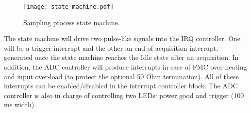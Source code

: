 \documentclass[a4paper]{article}
\begin{document}
\begin{figure}[htbp]
  \centering
  \texttt{[image: state\_machine.pdf]}
  \caption{Sampling process state machine.}
  \label{fig:state_machine}
\end{figure}

The state machine will drive two pulse-like signals into the IRQ controller. One will be a trigger interrupt and the other an end of acquisition interrupt, generated once the state machine reaches the Idle state after an acquisition. In addition, the ADC controller will produce interrupts in case of FMC over-heating and input over-load (to protect the optional 50 Ohm termination). All of these interrupts can be enabled/disabled in the interrupt controller block. The ADC controller is also in charge of controlling two LEDs: power good and trigger (100 ms width).
\end{document}
